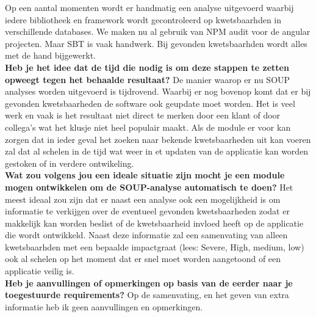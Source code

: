 Op een aantal momenten wordt er handmatig een analyse uitgevoerd waarbij iedere bibliotheek en framework wordt gecontroleerd op kwetsbaarhden in verschillende databases. We maken nu al gebruik van NPM audit voor de angular projecten. Maar SBT is vaak handwerk. Bij gevonden kwetsbaarhden wordt alles met de hand bijgewerkt.
\\

\textbf{Heb je het idee dat de tijd die nodig is om deze stappen te zetten opweegt tegen het behaalde resultaat? } De manier waarop er nu SOUP analyses worden uitgevoerd is tijdrovend. Waarbij er nog bovenop komt dat er bij gevonden kwetsbaarheden de software ook geupdate moet worden. Het is veel werk en vaak is het resultaat niet direct te merken door een klant of door collega's wat het klusje niet heel populair maakt. Als de module er voor kan zorgen dat in ieder geval het zoeken naar bekende kwetsbaarheden uit kan voeren zal dat al schelen in de tijd wat weer in et updaten van de applicatie kan worden gestoken of in verdere ontwikeling.
\\



\textbf{Wat zou volgens jou een ideale situatie zijn mocht je een module mogen ontwikkelen om de SOUP-analyse automatisch te doen? }Het meest ideaal zou zijn dat er naast een analyse ook een mogelijkheid is om informatie te verkijgen over de eventueel gevonden kwetsbaarheden zodat er makkelijk kan worden beslist of de kwetsbaarheid invloed heeft op de applicatie die wordt ontwikkeld. Naast deze informatie zal een samenvating van alleen kwetsbaarhden met een bepaalde impactgraat (lees: Severe, High, medium, low) ook al schelen op het moment dat er snel moet worden aangetoond of een applicatie veilig is.
\\

\textbf{Heb je aanvullingen of opmerkingen op basis van de eerder naar je toegestuurde requirements? } Op de samenvating, en het geven van extra informatie heb ik geen aanvullingen en opmerkingen.
\\

